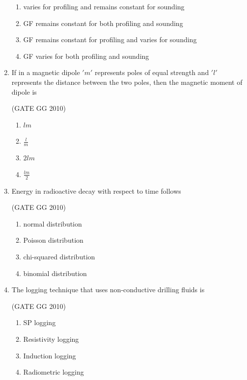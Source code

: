 \documentclass[journal]{IEEEtran}
\begin{document}
\begin{enumerate}[start=26]
\begin{enumerate}

     \item  varies for profiling and remains constant for sounding

\item  GF remains constant for both profiling and sounding

\item GF remains constant for profiling and varies for sounding

\item GF varies for both profiling and sounding

\end{enumerate}

\item If in a magnetic dipole $'m'$ represents poles of equal strength and $'l'$ represents the distance between the two poles, then the magnetic moment of dipole is

\hfill (GATE GG 2010) 
\begin{multicols}{4}

\begin{enumerate}
    \item $lm$
    \item $\frac{l}{m}$
    \item $2lm$
    \item $\frac{lm}{2}$
\end{enumerate}
\end{multicols}

\item  Energy in radioactive decay with respect to time follows

\hfill (GATE GG 2010) 

\begin{enumerate}
    \item normal distribution
\item Poisson distribution
\item chi-squared distribution
\item binomial distribution
\end{enumerate}

\item The logging technique that uses non-conductive drilling fluids is

\hfill (GATE GG 2010) 
\begin{enumerate}
 \item  SP logging
\item  Resistivity logging
\item Induction logging
\item Radiometric logging
\end{enumerate}


\end{enumerate}
\end{document}
